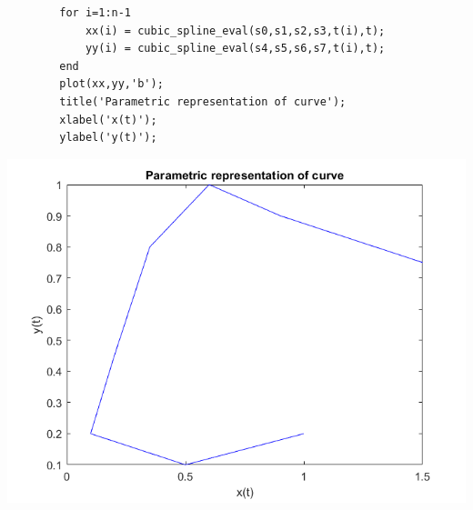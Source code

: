\documentclass{article}
\begin{document}
\begin{enumerate}
\begin{lstlisting}
        for i=1:n-1
            xx(i) = cubic_spline_eval(s0,s1,s2,s3,t(i),t);
            yy(i) = cubic_spline_eval(s4,s5,s6,s7,t(i),t);
        end
        plot(xx,yy,'b');
        title('Parametric representation of curve'); 
        xlabel('x(t)');
        ylabel('y(t)');
        \end{lstlisting}
        \begin{center}
                \includegraphics[scale=0.6]{parametric.png}
        \end{center}
        \end{enumerate}
\end{document}

